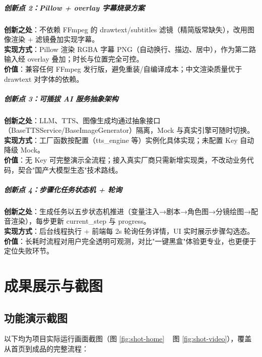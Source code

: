 \documentclass[12pt]{ctexrep}
\begin{document}
\paragraph{创新点 2：Pillow + overlay 字幕烧录方案}
\textbf{创新之处}：不依赖 FFmpeg 的 drawtext/subtitles 滤镜（精简版常缺失），改用图像渲染 + 滤镜叠加实现字幕。\\
\textbf{实现方式}：Pillow 渲染 RGBA 字幕 PNG（自动换行、描边、居中），作为第二路输入经 overlay 叠加；时长与位置完全可控。\\
\textbf{价值}：兼容任何 FFmpeg 发行版，避免重装/自编译成本；中文渲染质量优于 drawtext 对字体的依赖。

\paragraph{创新点 3：可插拔 AI 服务抽象架构}
\textbf{创新之处}：LLM、TTS、图像生成均通过抽象接口（BaseTTSService/BaseImageGenerator）隔离，Mock 与真实引擎可随时切换。\\
\textbf{实现方式}：工厂函数按配置（tts\_engine 等）实例化具体实现；未配置 Key 自动降级 Mock。\\
\textbf{价值}：无 Key 可完整演示全流程；接入真实厂商只需新增实现类，不改动业务代码，契合"国产大模型生态"技术路线。

\paragraph{创新点 4：步骤化任务状态机 + 轮询}
\textbf{创新之处}：生成任务以五步状态机推进（变量注入→剧本→角色图→分镜绘图→配音渲染），每步更新 current\_step 与 progress。\\
\textbf{实现方式}：后台线程执行 + 前端每 2s 轮询任务详情，UI 实时展示步骤勾选态。\\
\textbf{价值}：长耗时流程对用户完全透明可观测，对比"一键黑盒"体验更专业，也更便于定位失败环节。

\chapter{成果展示与截图}
\section{功能演示截图}

以下均为项目实际运行画面截图（图 \ref{fig:shot-home} ~ 图 \ref{fig:shot-video}），覆盖从首页到成品的完整流程：
\end{document}
